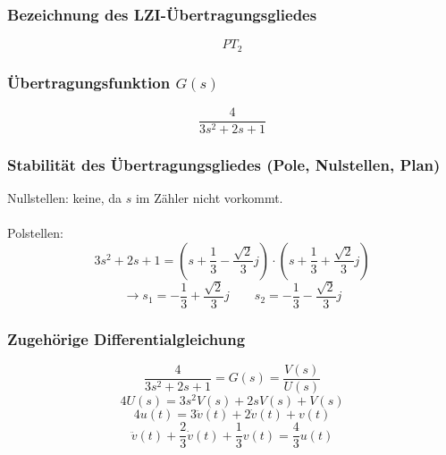\documentclass[a4paper,10pt,fleqn]{article}
\begin{document}
\subsubsection*{Bezeichnung des LZI-Übertragungsgliedes}
\[ PT_2 \]

\subsubsection*{Übertragungsfunktion $G(s)$}
\[ \frac{4}{3 s^2 + 2 s + 1} \]

\subsubsection*{Stabilität des Übertragungsgliedes (Pole, Nulstellen, Plan)}
Nullstellen: keine, da $s$ im Zähler nicht vorkommt. \\\\
Polstellen: 
\[ 3 s^2 + 2 s + 1 = \left(s + \frac{1}{3} - \frac{\sqrt{2}}{3}j\right) \cdot \left(s + \frac{1}{3} + \frac{\sqrt{2}}{3}j\right) \]
\[ \rightarrow s_1 = -\frac{1}{3} + \frac{\sqrt{2}}{3}j \qquad s_2 = -\frac{1}{3} - \frac{\sqrt{2}}{3}j \]
\begin{figure}[h!]
    \centering
\end{figure}

\subsubsection*{Zugehörige Differentialgleichung}
\[ \frac{4}{3 s^2 + 2 s + 1} = G(s) = \frac{V(s)}{U(s)} \]
\[ 4 U(s) = 3 s^2 V(s) + 2 s V(s) + V(s) \]
\[ 4 u(t) = 3 \ddot{v}(t) + 2 \dot{v}(t) + v(t) \]
\[ \ddot{v}(t) + \frac{2}{3} \dot{v}(t) + \frac{1}{3} v(t) = \frac{4}{3} u(t) \]
\end{document}
